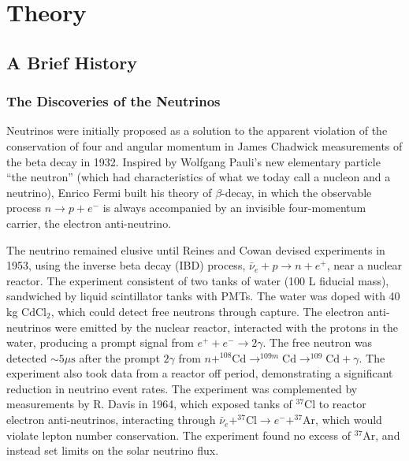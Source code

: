 \chapter{Theory}
\label{chap:theory}

\section{A Brief History}

\subsection{The Discoveries of the Neutrinos}
Neutrinos were initially proposed as a solution to the apparent violation of the conservation of four and angular momentum in James Chadwick measurements of the beta decay in 1932\cite{Chadwick1,Chadwick2}. Inspired by Wolfgang Pauli's new elementary particle ``the neutron'' (which had characteristics of what we today call a nucleon and a neutrino)\cite{pauli_1933}, Enrico Fermi built his theory of $\beta$-decay\cite{fermi_1934}, in which the observable process $n \rightarrow p + e^-$ is always accompanied by an invisible four-momentum carrier, the electron anti-neutrino.

The neutrino remained elusive until Reines and Cowan devised experiments\cite{reines_cowan_1,reines_cowan_2} in 1953, using the inverse beta decay (IBD) process, $\bar{\nu}_e + p \rightarrow n + e^+$, near a nuclear reactor. The experiment consistent of two tanks of water (100 L fiducial mass), sandwiched by liquid scintillator tanks with PMTs. The water was doped with 40 kg $\text{CdCl}_2$, which could detect free neutrons through capture. The electron anti-neutrinos were emitted by the nuclear reactor, interacted with the protons in the water, producing a prompt signal from $e^+ + e^- \rightarrow 2\gamma$. The free neutron was detected $\sim5\mu\text{s}$ after the prompt $2\gamma$ from $n + ^{108}\text{Cd} \rightarrow ^{109m}\text{Cd} \rightarrow ^{109}\text{Cd} + \gamma$. The experiment also took data from a reactor off period, demonstrating a significant reduction in neutrino event rates. The experiment was complemented by measurements by R. Davis\cite{davis} in 1964, which exposed tanks of $^{37}\text{Cl}$ to reactor electron anti-neutrinos, interacting through $\bar{\nu}_e + ^{37}\text{Cl} \rightarrow e^- + ^{37}\text{Ar}$, which would violate lepton number conservation. The experiment found no excess of $^{37}\text{Ar}$, and instead set limits on the solar neutrino flux.

